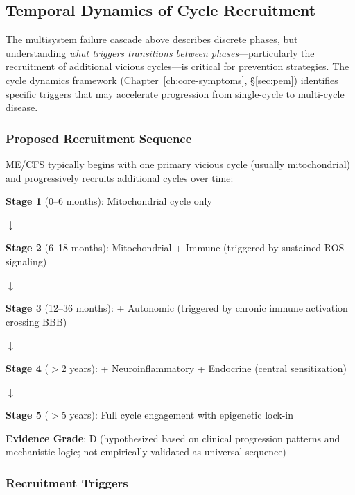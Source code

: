 \subsection{Temporal Dynamics of Cycle Recruitment}
\label{subsec:cycle-recruitment-dynamics}

The multisystem failure cascade above describes discrete phases, but understanding \textit{what triggers transitions between phases}---particularly the recruitment of additional vicious cycles---is critical for prevention strategies. The cycle dynamics framework (Chapter~\ref{ch:core-symptoms}, \S\ref{sec:pem}) identifies specific triggers that may accelerate progression from single-cycle to multi-cycle disease.

\subsubsection{Proposed Recruitment Sequence}

\begin{hypothesis}
ME/CFS typically begins with one primary vicious cycle (usually mitochondrial) and progressively recruits additional cycles over time:

\textbf{Stage 1} (0--6 months): Mitochondrial cycle only

$\downarrow$

\textbf{Stage 2} (6--18 months): Mitochondrial + Immune (triggered by sustained ROS signaling)

$\downarrow$

\textbf{Stage 3} (12--36 months): + Autonomic (triggered by chronic immune activation crossing BBB)

$\downarrow$

\textbf{Stage 4} ($>$2 years): + Neuroinflammatory + Endocrine (central sensitization)

$\downarrow$

\textbf{Stage 5} ($>$5 years): Full cycle engagement with epigenetic lock-in

\textbf{Evidence Grade}: D (hypothesized based on clinical progression patterns and mechanistic logic; not empirically validated as universal sequence)
\end{hypothesis}

\subsubsection{Recruitment Triggers}

